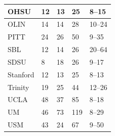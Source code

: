 \begin{table}[h!]
\begin{center}
\begin{tabular}{|l|l|l|l|l|}
OHSU                                                 & 12                                & 13                                    & 25                                  & 8–15                                                     \\ \hline
OLIN                                                 & 14                                & 14                                    & 28                                  & 10–24                                                    \\ \hline
PITT                                                 & 24                                & 26                                    & 50                                  & 9–35                                                     \\ \hline
SBL                                                  & 12                                & 14                                    & 26                                  & 20–64                                                    \\ \hline
SDSU                                                 & 8                                 & 18                                    & 26                                  & 9–17                                                     \\ \hline
Stanford                                             & 12                                & 13                                    & 25                                  & 8–13                                                     \\ \hline
Trinity                                              & 19                                & 25                                    & 44                                  & 12–26                                                    \\ \hline
UCLA                                                 & 48                                & 37                                    & 85                                  & 8–18                                                     \\ \hline
UM                                                   & 46                                & 73                                    & 119                                 & 8–29                                                     \\ \hline
USM                                                  & 43                                & 24                                    & 67                                  & 9–50                                                     \\ \hline

\end{tabular}
\end{center}
\end{table}
